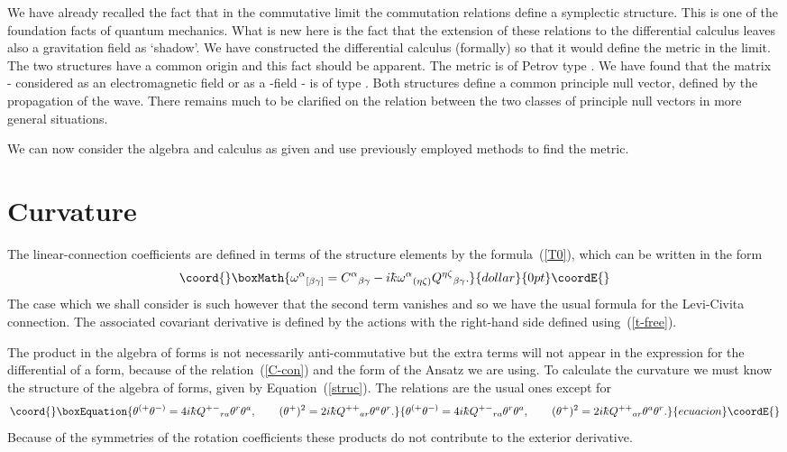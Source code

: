 \documentclass[12pt,a4paper]{article}
\newcounter{eg}
\def\kbar{{\mathchar'26\mkern-9muk}}
\providecommand{\initiate}{\setcounter{equation}{0}}
\begin{document}
We have already recalled the fact that in the commutative limit the
commutation relations define a symplectic structure. This is one of
the foundation facts of quantum mechanics.  What is new here is the
fact that the extension of these relations to the differential
calculus leaves also a gravitation field as `shadow'.  We have
constructed the differential calculus (formally) so that it would
define the \coordHE{} metric in the limit. The two structures have a common
origin and this fact should be apparent.  The \coordHE{} metric is of Petrov
type \coordHE{}. We have found that the matrix~\coordHE{} - considered
as an electromagnetic field or as a \coordHE{}-field - is of type \coordHE{}. Both
structures define a common principle null vector, defined by the
propagation of the wave. There remains much to be clarified on the
relation between the two classes of principle null vectors in more
general situations.

We can now consider the algebra and calculus as given and use
previously employed methods to find the metric.

\initiate
\section{Curvature}                                         \label{curv}

The linear-connection coefficients are defined in terms of the
structure elements by the formula~(\ref{T0}), which can be written in
the form
$$\coord{}\boxMath{
\omega^\alpha{}_{[\beta\gamma]} = C^\alpha{}_{\beta\gamma} - 
i\kbar \omega^\alpha{}_{(\eta\zeta)} Q^{\eta\zeta}{}_{\beta\gamma}.
}{dollar}{0pt}\coordE{}$$
The case which we shall consider is such however that the second
term vanishes and so we have the usual formula for the Levi-Civita
connection.  The associated covariant derivative is defined by the
actions \coordHE{} with
the right-hand side defined using~(\ref{t-free}). 

The product in the algebra of forms is not necessarily
anti-commutative but the extra terms will not appear in the expression
for the differential of a form, because of the relation~(\ref{C-con})
and the form of the Ansatz we are using. To calculate the curvature we
must know the structure of the algebra of forms, given by
Equation~(\ref{struc}).  The relations are the usual ones except for
\begin{equation}\coord{}\boxEquation{
\theta^{(+}\theta^{-)} = 4i\kbar Q^{+-}{}_{ra} \theta^r\theta^a ,\qquad
(\theta^+)^2 = 2i\kbar  Q^{++}{}_{ar} \theta^a \theta^r.    \label{acr}
}{
\theta^{(+}\theta^{-)} = 4i\kbar Q^{+-}{}_{ra} \theta^r\theta^a ,\qquad
(\theta^+)^2 = 2i\kbar  Q^{++}{}_{ar} \theta^a \theta^r.    }{ecuacion}\coordE{}\end{equation}
Because of the symmetries of the rotation coefficients these products
do not contribute to the exterior derivative.
\end{document}
